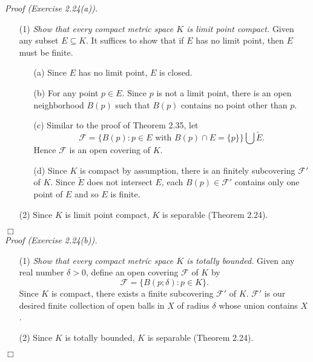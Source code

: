 \documentclass{article}
\begin{document}
\emph{Proof (Exercise 2.24(a)).}
\begin{enumerate}
\item[(1)]
\emph{Show that every compact metric space $K$ is limit point compact.}
Given any subset $E \subseteq K$.
It suffices to show that if $E$ has no limit point, then $E$ must be finite.
  \begin{enumerate}
  \item[(a)]
  Since $E$ has no limit point, $E$ is closed.
  \item[(b)]
  For any point $p \in E$. Since $p$ is not a limit point,
  there is an open neighborhood $B(p)$ such that $B(p)$ contains no point other than $p$.
  \item[(c)]
  Similar to the proof of Theorem 2.35,
  let
  $$\mathscr{F} = \{ B(p) : p \in E \text{ with } B(p) \cap E = \{p\} \}
  \bigcup \widetilde{E}.$$
  Hence $\mathscr{F}$ is an open covering of $K$.
  \item[(d)]
  Since $K$ is compact by assumption,
  there is an finitely subcovering $\mathscr{F}'$ of $K$.
  Since $\widetilde{E}$ does not intersect $E$,
  each $B(p) \in \mathscr{F}'$
  contains only one point of $E$ and so $E$ is finite.
  \end{enumerate}
\item[(2)]
Since $K$ is limit point compact, $K$ is separable (Theorem 2.24).
\end{enumerate}
$\Box$ \\

\emph{Proof (Exercise 2.24(b)).}
\begin{enumerate}
\item[(1)]
\emph{Show that every compact metric space $K$ is totally bounded.}
Given any real number $\delta > 0$,
define an open covering $\mathscr{F}$ of $K$ by
$$\mathscr{F} = \{ B(p;\delta) : p \in K \}.$$
Since $K$ is compact,
there exists a finite subcovering $\mathscr{F}'$ of $K$.
$\mathscr{F}'$ is our desired finite collection of open balls in $X$
of radius $\delta$ whose union contains $X$.
\item[(2)]
Since $K$ is totally bounded, $K$ is separable (Theorem 2.24).
\end{enumerate}
$\Box$ \\
\end{document}
